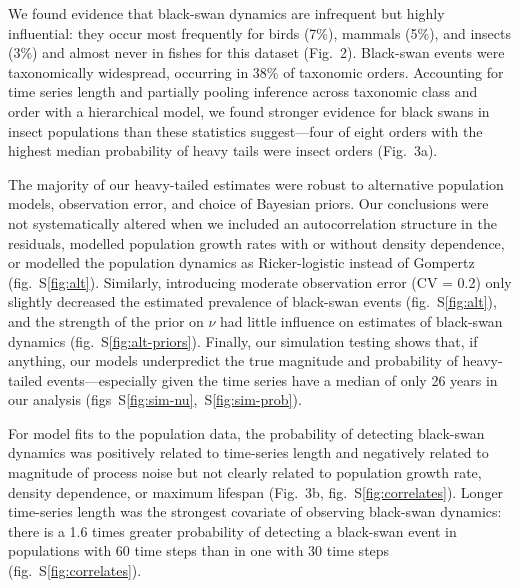 We found evidence that black-swan dynamics are infrequent but highly influential: they occur most frequently for birds (7\%), mammals (5\%), and insects (3\%) and almost never in fishes for this dataset (Fig.~2). Black-swan events were taxonomically widespread, occurring in 38\% of taxonomic orders. Accounting for time series length and partially pooling inference across taxonomic class and order with a hierarchical model, we found stronger evidence for black swans in insect populations than these statistics suggest---four of eight orders with the highest median probability of heavy tails were insect orders (Fig.~3a).

The majority of our heavy-tailed estimates were robust to alternative population models, observation error, and choice of Bayesian priors. Our conclusions were not systematically altered when we included an autocorrelation structure in the residuals, modelled population growth rates with or without density dependence, or modelled the population dynamics as Ricker-logistic instead of Gompertz (fig.~S\ref{fig:alt}). Similarly, introducing moderate observation error (CV = 0.2) only slightly decreased the estimated prevalence of black-swan events (fig.~S\ref{fig:alt}), and the strength of the prior on \(\nu\) had little influence on estimates of black-swan dynamics (fig.~S\ref{fig:alt-priors}). Finally, our simulation testing shows that, if anything, our models underpredict the true magnitude and probability of heavy-tailed events---especially given the time series have a median of only 26 years in our analysis (figs~S\ref{fig:sim-nu},~S\ref{fig:sim-prob}).

For model fits to the population data, the probability of detecting black-swan dynamics was positively related to time-series length and negatively related to magnitude of process noise but not clearly related to population growth rate, density dependence, or maximum lifespan (Fig.~3b, fig.~S\ref{fig:correlates}). Longer time-series length was the strongest covariate of observing black-swan dynamics: there is a 1.6 times greater probability of detecting a black-swan event in populations with 60 time steps than in one with 30 time steps (fig.~S\ref{fig:correlates}).

